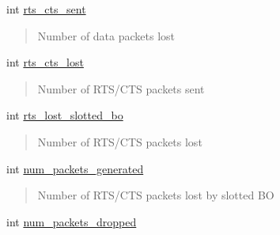 \begin{DoxyCompactItemize}
int \hyperlink{structPerformance_a9f80fa31726ff34bb6cf7cd2e4a98c8f}{rts\+\_\+cts\+\_\+sent}
\begin{DoxyCompactList}\small\item\em \begin{quote}
Number of data packets lost \end{quote}
\end{DoxyCompactList}\item 
\mbox{\label{structPerformance_a8a09dfa591827207d4d730d80ae46db4}} 
int \hyperlink{structPerformance_a8a09dfa591827207d4d730d80ae46db4}{rts\+\_\+cts\+\_\+lost}
\begin{DoxyCompactList}\small\item\em \begin{quote}
Number of R\+T\+S/\+C\+TS packets sent \end{quote}
\end{DoxyCompactList}\item 
\mbox{\label{structPerformance_a0270bd0815b7c9bdec81c64ca133b770}} 
int \hyperlink{structPerformance_a0270bd0815b7c9bdec81c64ca133b770}{rts\+\_\+lost\+\_\+slotted\+\_\+bo}
\begin{DoxyCompactList}\small\item\em \begin{quote}
Number of R\+T\+S/\+C\+TS packets lost \end{quote}
\end{DoxyCompactList}\item 
\mbox{\label{structPerformance_a3414f7e23dbcc80f97a610d1282485e7}} 
int \hyperlink{structPerformance_a3414f7e23dbcc80f97a610d1282485e7}{num\+\_\+packets\+\_\+generated}
\begin{DoxyCompactList}\small\item\em \begin{quote}
Number of R\+T\+S/\+C\+TS packets lost by slotted BO \end{quote}
\end{DoxyCompactList}\item 
\mbox{\label{structPerformance_ab806f0bc1ff7587ff083d17742c82463}} 
int \hyperlink{structPerformance_ab806f0bc1ff7587ff083d17742c82463}{num\+\_\+packets\+\_\+dropped}
\begin{DoxyCompactList}\small\item\em \begin{quote}

\end{quote}
\end{DoxyCompactList}
\end{DoxyCompactItemize}
